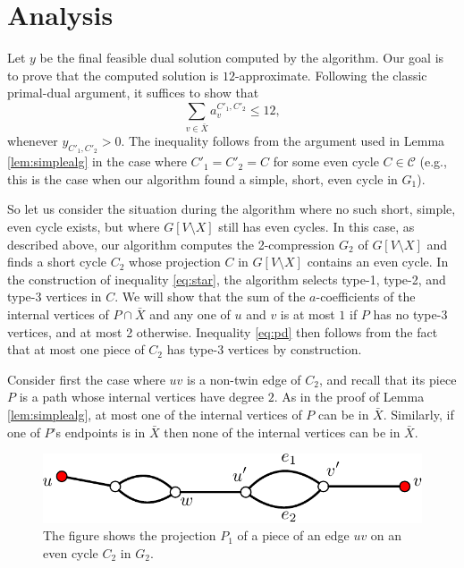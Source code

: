 \documentclass{article}
\newcommand{\C}{\ensuremath{\mathcal{C}}}
\newcommand{\0}{\mathbb{0}}
\newcommand{\1}{\mathbb{1}}
\begin{document}
\section{Analysis}

Let $y$ be the final feasible dual solution computed by the algorithm. 
Our goal is to prove that the computed solution is $12$-approximate. 
Following the classic primal-dual argument, it
suffices to show that
\begin{equation}\label{eq:pd}
\sum_{v \in \bar{X}} a^{C'_1,C'_2}_v \leq 12,
\end{equation}
whenever $y_{C'_1,C'_2}>0$. The inequality follows from the argument used in Lemma 
\ref{lem:simplealg} in the case where $C'_1=C'_2=C$ for some even cycle $C \in \C$
(e.g., this is the
case when our algorithm found a simple, short, even cycle in $G_1$).

So let us consider the situation during the algorithm where no such short, simple, even
cycle exists, but where $G[V\setminus X]$ still has even cycles. 
In this case, as described above, our algorithm computes the 2-compression $G_2$ of $G
[V\setminus X]$ and finds a short cycle $C_2$ whose projection $C$ in $G[V\setminus
X]$ contains an even cycle. In the construction of inequality \eqref{eq:star}, the
algorithm selects
type-1, type-2, and type-3 vertices in $C$.
We will show that the sum of the $a$-coefficients of
the internal vertices of $P \cap \bar{X}$ and any one of $u$ and $v$ is at most $1$ if $P$
has no type-3 vertices, and at most 2 otherwise. Inequality 
\eqref{eq:pd} then follows from the fact that at most one piece of $C_2$ has type-3
vertices by construction. 

Consider first the case where $uv$ is a non-twin edge of $C_2$, and recall that its
piece $P$ is a path whose internal vertices have degree $2$. As in the proof of Lemma 
\ref{lem:simplealg}, at most one of the internal vertices of $P$ can be in $\bar{X}$.
Similarly, if
one of $P$'s endpoints is in $\bar{X}$ then none of the internal vertices can be in
$\bar{X}$.

\begin{figure}
  \begin{center}
    \includegraphics[width=.5\textwidth]{piece.pdf}
  \end{center}  
  \caption{\label{fig:piece} The figure shows the projection $P_1$ of a piece of an
  edge $uv$ on an even
  cycle $C_2$ in $G_2$.}
\end{figure}  
\end{document}
